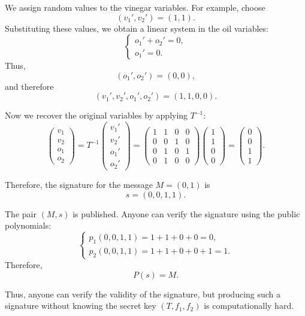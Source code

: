 \noindent
We assign random values to the vinegar variables. For example, choose
\[
(v_1',v_2')=(1,1).
\]
Substituting these values, we obtain a linear system in the oil variables:
\[
\begin{cases}
o_1'+o_2'=0,\\
o_1'=0.
\end{cases}
\]
Thus,
\[
(o_1',o_2')=(0,0),
\]
and therefore
\[
(v_1',v_2',o_1',o_2')=(1,1,0,0).
\]

\noindent
Now we recover the original variables by applying \(T^{-1}\):
\[
\begin{pmatrix}
v_1\\
v_2\\
o_1\\
o_2
\end{pmatrix}
=
T^{-1}
\begin{pmatrix}
v_1'\\
v_2'\\
o_1'\\
o_2'
\end{pmatrix}
=
\begin{pmatrix}
1 & 1 & 0 & 0\\
0 & 0 & 1 & 0\\
0 & 1 & 0 & 1\\
0 & 1 & 0 & 0
\end{pmatrix}
\begin{pmatrix}
1\\
1\\
0\\
0
\end{pmatrix}
=
\begin{pmatrix}
0\\
0\\
1\\
1
\end{pmatrix}.
\]

\noindent
Therefore, the signature for the message \(M=(0,1)\) is
\[
s=(0,0,1,1).
\]

\noindent
The pair \((M,s)\) is published. Anyone can verify the signature using the public polynomials:
\[
\begin{cases}
p_1(0,0,1,1)=1+1+0+0=0,\\
p_2(0,0,1,1)=1+1+0+0+1=1.
\end{cases}
\]
Therefore,
\[
P(s)=M.
\]

\noindent
Thus, anyone can verify the validity of the signature, but producing such a signature without knowing the secret key \((T,f_1,f_2)\) is computationally hard.


